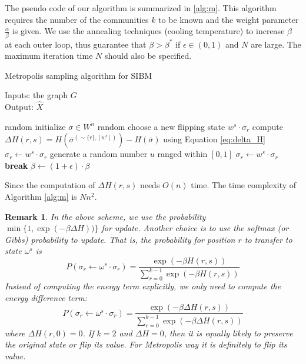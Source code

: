 \documentclass{ctexart}
\newtheorem{remark}{Remark}
\begin{document}
	The pseudo code of our algorithm is summarized in \ref{alg:m}. This algorithm requires the number of the communities $k$ to be known and the weight parameter $\frac{\alpha}{\beta}$ is given. We use the annealing techniques (cooling temperature) to increase $\beta$ at each outer loop, thus guarantee that $\beta > \beta^*$
	if $\epsilon \in (0, 1)$ and $N$ are large. 
	The maximum iteration time $N$ should also be specified.
	\begin{algorithm}[H]
		\caption{Metropolis sampling algorithm for SIBM} \label{alg:m}
		Inputs: the graph $G$ \\
		Output: $\hat{X}$
		\begin{algorithmic}[1]
			\STATE random initialize $\sigma \in W^n$
			\STATE random choose a new flipping state $w^s \cdot \sigma_r$
			\STATE compute $\Delta H(r,s) = H(\bar{\sigma}^{(\sim \{r\}, [w^s])}) - H(\bar{\sigma})$ using Equation \eqref{eq:delta_H}
			\STATE $\sigma_r \leftarrow w^s \cdot \sigma_r$
			\ELSE
			\STATE generate a random number $u$ ranged within $[0,1]$
			\STATE $\sigma_r \leftarrow w^s \cdot \sigma_r$
			\ENDIF
			\ENDIF
			\ENDFOR
			\STATE \textbf{break}
			\ENDIF
			\STATE $\beta \leftarrow (1 + \epsilon)\cdot\beta$
			\ENDWHILE
		\end{algorithmic}
	\end{algorithm}
	Since the computation of $\Delta H(r,s)$ needs $O(n)$ time. The time complexity of Algorithm \ref{alg:m} is $Nn^2$.
	\begin{remark}
	In the above scheme, we use the probability $\min\{1, \exp(-\beta \Delta H))\}$ for update. Another choice is to use
	the softmax (or Gibbs) probability to update. That is, the probability for position $r$ to transfer to state $\omega^s$ is
	$$
	P(\sigma_r \leftarrow \omega^s \cdot \sigma_r) = \frac{\exp(-\beta H(r, s))}{\sum_{r=0}^{k-1} \exp(-\beta H(r, s))}
	$$
	Instead of computing the energy term explicitly, we only need to compute the energy difference term:
	$$
	P(\sigma_r \leftarrow \omega^s \cdot \sigma_r) = \frac{\exp(-\beta \Delta H(r, s))}{\sum_{r=0}^{k-1} \exp(-\beta \Delta H(r, s))}
	$$
	where $\Delta H(r, 0) = 0$.
	If $k=2$ and $\Delta H = 0$, then it is equally likely to preserve the original state or flip its value. For Metropolis way it is
	definitely to flip its value.
	\end{remark}
\end{document}
